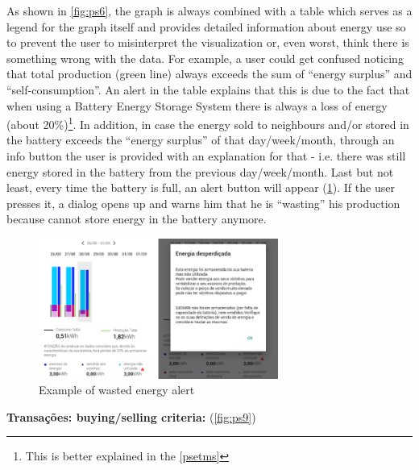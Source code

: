 As shown in  \cref{fig:ps6}, the graph is always combined with a table which serves as a legend for the graph itself and provides detailed information about energy use so to prevent the user to misinterpret the visualization or, even worst, think there is something wrong with the data. For example, a user could get confused noticing that total production (green line) always exceeds the sum of “energy surplus” and “self-consumption”. An alert in the table explains that this is due to the fact that when using a Battery Energy Storage System there is always a loss of energy (about 20\%)\footnote{This is better explained in the \ref{psetms}}. In addition, in case the energy sold to neighbours and/or stored in the battery exceeds the “energy surplus” of that day/week/month, through an info button the user is provided with an explanation for that - i.e. there was still energy stored in the battery from the previous day/week/month.
Last but not least, every time the battery is full, an alert button will appear (\cref{fig:ps8}). If the user presses it, a dialog opens up and warns him that he is “wasting” his production because cannot store energy in the battery anymore.


\begin{figure}[h]
\centering
\includegraphics[width=0.7\textwidth]{./Images/ps8}
\caption{Example of wasted energy alert}
\label{fig:ps8}
\end{figure}


\textbf{ Transações: buying/selling criteria:} (\cref{fig:ps9})

